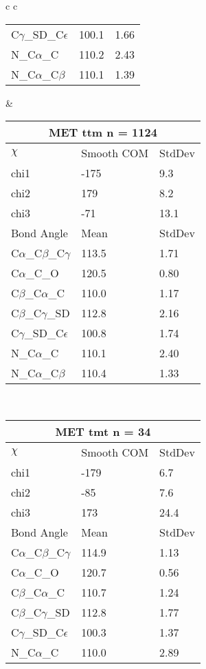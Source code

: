 \begin{longtable}{ c c }
\begin{tabular}{ l l l }
  C$\gamma$\_SD\_C$\epsilon$ & 100.1 & 1.66\\
  N\_C$\alpha$\_C & 110.2 & 2.43\\
  N\_C$\alpha$\_C$\beta$ & 110.1 & 1.39\\
  \bottomrule
  \end{tabular}
  &
  \begin{tabular}{ l l l }
  \toprule
  \multicolumn{3}{c}{MET \textbf{ttm} n = 1124} \\ \toprule
  $\chi$       & Smooth COM & StdDev \\ \midrule
  chi1 & -175 & 9.3 \\ 
  chi2 & 179 & 8.2 \\ 
  chi3 & -71 & 13.1 \\ \midrule
  Bond Angle   & Mean     & StdDev \\ \midrule
  C$\alpha$\_C$\beta$\_C$\gamma$ & 113.5 & 1.71\\
  C$\alpha$\_C\_O & 120.5 & 0.80\\
  C$\beta$\_C$\alpha$\_C & 110.0 & 1.17\\
  C$\beta$\_C$\gamma$\_SD & 112.8 & 2.16\\
  C$\gamma$\_SD\_C$\epsilon$ & 100.8 & 1.74\\
  N\_C$\alpha$\_C & 110.1 & 2.40\\
  N\_C$\alpha$\_C$\beta$ & 110.4 & 1.33\\
  \bottomrule
  \end{tabular}
  \\
  \begin{tabular}{ l l l }
  \toprule
  \multicolumn{3}{c}{MET \textbf{tmt} n = 34} \\ \toprule
  $\chi$       & Smooth COM & StdDev \\ \midrule
  chi1 & -179 & 6.7 \\ 
  chi2 & -85 & 7.6 \\ 
  chi3 & 173 & 24.4 \\ \midrule
  Bond Angle   & Mean     & StdDev \\ \midrule
  C$\alpha$\_C$\beta$\_C$\gamma$ & 114.9 & 1.13\\
  C$\alpha$\_C\_O & 120.7 & 0.56\\
  C$\beta$\_C$\alpha$\_C & 110.7 & 1.24\\
  C$\beta$\_C$\gamma$\_SD & 112.8 & 1.77\\
  C$\gamma$\_SD\_C$\epsilon$ & 100.3 & 1.37\\
  N\_C$\alpha$\_C & 110.0 & 2.89\\

\end{tabular}
\end{longtable}
